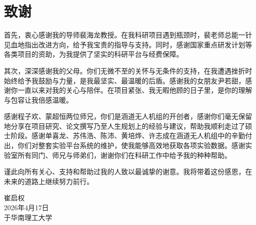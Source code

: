 \chapter{致\texorpdfstring{\quad}{}谢}
首先，衷心感谢我的导师裴海龙教授。在我科研项目遇到瓶颈时，裴老师总能一针见血地指出改进方向，给予我宝贵的指导与支持。同时，感谢国家重点研发计划等各类项目的资助，为我提供了坚实的科研平台与经费保障。

其次，深深感谢我的父母。你们无微不至的关怀与无条件的支持，在我遭遇挫折时始终给予我鼓励与力量，是我最坚实、最温暖的后盾。感谢我的女朋友尹若甜，感谢你一直以来对我的关心与陪伴。在项目紧张、我无暇他顾的日子里，是你的理解与包容让我倍感温暖。

感谢程子欢、蒙超恒两位师兄，你们是涵道无人机组的开创者，感谢你们毫无保留地分享在项目研究、论文撰写乃至人生规划上的经验与建议，帮助我顺利走过了硕士阶段。感谢单喜龙、苏伟浩、陈沛、黄培烨、许志成在涵道无人机组中的辛勤付出，你们对整套实验平台系统的维护，使我能够高效地获取各项实验数据。感谢实验室所有同门、师兄与师弟们，谢谢你们在科研工作中给予我的种种帮助。

谨此向所有关心、支持和帮助过我的人致以最诚挚的谢意。我将带着这份感恩，在未来的道路上继续努力前行。
~\\

\begin{minipage}[t]{0.945\textwidth}%
	\begin{flushright}
		崔启权\\
		2026年4月17日\\	%
		于华南理工大学
		\par\end{flushright}
\end{minipage}

